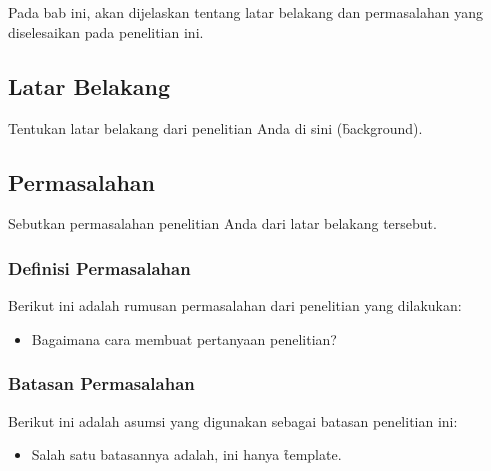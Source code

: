 \chapter{\babSatu}
Pada bab ini, akan dijelaskan tentang latar belakang dan permasalahan yang diselesaikan pada penelitian ini.


\section{Latar Belakang}
Tentukan latar belakang dari penelitian Anda di sini (\f{background}).

\section{Permasalahan}
Sebutkan permasalahan penelitian Anda dari latar belakang tersebut.

\subsection{Definisi Permasalahan}
Berikut ini adalah rumusan permasalahan dari penelitian yang dilakukan:
\begin{itemize}
	\item Bagaimana cara membuat pertanyaan penelitian?
\end{itemize}


\subsection{Batasan Permasalahan}
Berikut ini adalah asumsi yang digunakan sebagai batasan penelitian ini:
\begin{itemize}
	\item Salah satu batasannya adalah, ini hanya \f{template}.
\end{itemize}


